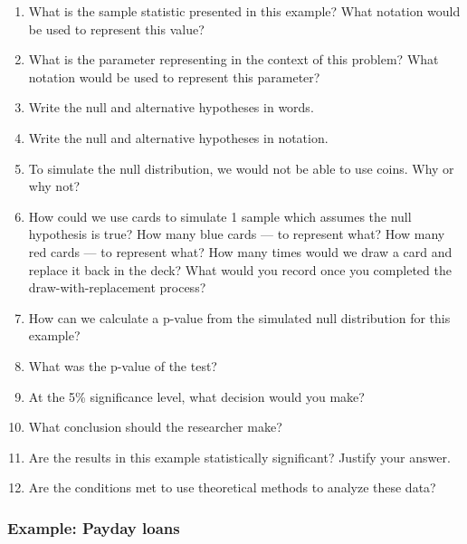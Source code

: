 \documentclass[
]{report}
\newcommand{\rgs}{\vspace{12pt}} %
\begin{document}
\begin{enumerate}
\def\labelenumi{\arabic{enumi}.}
\item
  What is the sample statistic presented in this example? What notation would be used to represent this value?
  \rgs
\item
  What is the parameter representing in the context of this problem? What notation would be used to represent this parameter?
  \rgs
\item
  Write the null and alternative hypotheses in words.
  \rgs
\item
  Write the null and alternative hypotheses in notation.
  \rgs
\item
  To simulate the null distribution, we would not be able to use coins. Why or why not?
  \rgs
\item
  How could we use cards to simulate 1 sample which assumes the null hypothesis is true? How many blue cards --- to represent what? How many red cards --- to represent what? How many times would we draw a card and replace it back in the deck? What would you record once you completed the draw-with-replacement process?
  \rgs
\item
  How can we calculate a p-value from the simulated null distribution for this example?
  \rgs
\item
  What was the p-value of the test?
  \rgs
\item
  At the 5\% significance level, what decision would you make?
  \rgs
\item
  What conclusion should the researcher make?
  \rgs
\item
  Are the results in this example statistically significant? Justify your answer.
  \rgs
\item
  Are the conditions met to use theoretical methods to analyze these data?
  \rgs
\end{enumerate}

\hypertarget{example-payday-loans}{%
\subsubsection*{Example: Payday loans}\label{example-payday-loans}}
\end{document}
